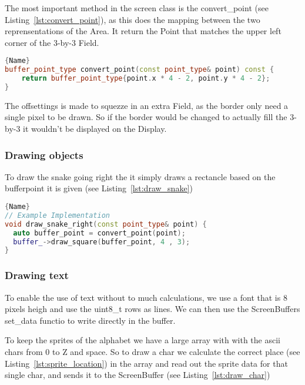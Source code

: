The most important method in the screen class is the convert\_point (see Listing~\ref{lst:convert_point}), as this does the mapping between the two reprensentations of the Area. It return the Point that matches the upper left corner of the 3-by-3 Field.

\begin{lstlisting}[caption={Converting an Area's point to a Display's point},label={lst:convert_point},frame=tlrb, language=C++]{Name}
buffer_point_type convert_point(const point_type& point) const {
    return buffer_point_type{point.x * 4 - 2, point.y * 4 - 2};
}
\end{lstlisting}

The offsettings is made to squezze in an extra Field, as the border only need a single pixel to be drawn. So if the border would be changed to actually fill the 3-by-3 it wouldn't be displayed on the Display.

\subsubsection{Drawing objects}

To draw the snake going right the it simply draws a rectancle based on the bufferpoint it is given (see Listing~\ref{lst:draw_snake})

\begin{lstlisting}[caption={Drawing a snake turning right},label={lst:draw_snake},frame=tlrb, language=C++]{Name}
// Example Implementation
void draw_snake_right(const point_type& point) {
  auto buffer_point = convert_point(point);
  buffer_->draw_square(buffer_point, 4 , 3);
}
\end{lstlisting}

\subsubsection{Drawing text}

To enable the use of text without to much calculations, we use a font that is 8 pixels heigh and use the uint8\_t rows as lines. We can then use the ScreenBuffers set\_data functio to write directly in the buffer.

To keep the sprites of the alphabet we have a large array with with the ascii chars from 0 to Z and space. So to draw a char we calculate the correct place (see Listing~\ref{lst:sprite_location}) in the array and read out the sprite data for that single char, and sends it to the ScreenBuffer (see Listing~\ref{lst:draw_char})

